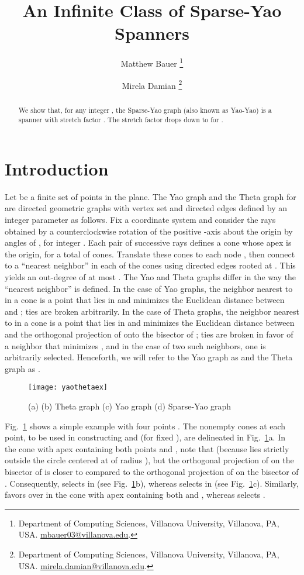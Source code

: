 \documentclass[11pt]{article}
\begin{document}
\title{An Infinite Class of Sparse-Yao Spanners}
\author{Matthew Bauer
    \thanks{ Department of Computing Sciences, Villanova University, Villanova, PA, USA. \protect\url{mbauer03@villanova.edu}.}
\and
Mirela Damian
    \thanks{ Department of Computing Sciences, Villanova University, Villanova, PA, USA. \protect\url{mirela.damian@villanova.edu}.}
}

\date{}

\maketitle

\begin{abstract}
We show that, for any integer , the Sparse-Yao graph  (also known as Yao-Yao) is a spanner with stretch factor . The stretch factor drops down to  for .
\end{abstract}

\section{Introduction}
Let  be a finite set of points in the plane. The Yao graph and the Theta graph for  are directed geometric graphs with vertex set  and directed edges defined by an integer parameter  as follows. Fix a coordinate system and consider the rays obtained by a counterclockwise rotation of the positive -axis about the origin by angles of , for integer . Each pair of successive rays defines a cone whose apex is the origin, for a total of  cones. Translate these cones to each node , then connect  to a ``nearest neighbor'' in each of the  cones using directed edges rooted at . This yields an out-degree of at most . The Yao and Theta graphs differ in the way the ``nearest neighbor'' is defined.
In the case of Yao graphs, the neighbor nearest to  in a cone  is a point  that lies in  and minimizes the Euclidean distance  between  and ; ties are broken arbitrarily.
In the case of Theta graphs, the neighbor nearest to  in a cone  is a point  that lies in  and minimizes the Euclidean distance between  and the orthogonal projection of  onto the bisector of ; ties are broken in favor of a neighbor  that minimizes , and in the case of two such neighbors, one is arbitrarily selected.
Henceforth, we will refer to the Yao graph as  and the Theta graph as .
\begin{figure}[htpb]
\centering
\texttt{[image: yaothetaex]}
\caption{(a)  (b) Theta graph  (c) Yao graph  (d) Sparse-Yao graph }
\label{fig:yaothetaex}
\end{figure}
Fig.~\ref{fig:yaothetaex} shows a simple example with four points .
The nonempty cones at each point, to be used in constructing  and  (for fixed ),
are delineated in Fig.~\ref{fig:yaothetaex}a. In the cone  with apex  containing both points
 and , note that  (because  lies strictly outside the circle centered at
 of radius ), but the orthogonal projection of  on the bisector of  is closer to 
compared to the orthogonal projection of  on the bisector of . Consequently,  selects
 in  (see Fig.~\ref{fig:yaothetaex}b), whereas  selects  in  (see Fig.~\ref{fig:yaothetaex}c).
Similarly,  favors  over  in the cone with apex  containing both  and ,
whereas  selects .
\end{document}
